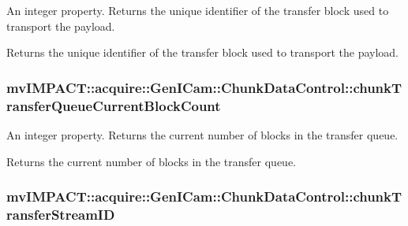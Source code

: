 An integer property. Returns the unique identifier of the transfer block used to transport the payload. 

Returns the unique identifier of the transfer block used to transport the payload. \hypertarget{classmv_i_m_p_a_c_t_1_1acquire_1_1_gen_i_cam_1_1_chunk_data_control_a0eba9a22dc04bd1928c4807cb6dd45fe}{
\subsubsection[{chunk\+Transfer\+Queue\+Current\+Block\+Count}]{ mv\+I\+M\+P\+A\+C\+T\+::acquire\+::\+Gen\+I\+Cam\+::\+Chunk\+Data\+Control\+::chunk\+Transfer\+Queue\+Current\+Block\+Count}}\label{classmv_i_m_p_a_c_t_1_1acquire_1_1_gen_i_cam_1_1_chunk_data_control_a0eba9a22dc04bd1928c4807cb6dd45fe}


An integer property. Returns the current number of blocks in the transfer queue. 

Returns the current number of blocks in the transfer queue. \hypertarget{classmv_i_m_p_a_c_t_1_1acquire_1_1_gen_i_cam_1_1_chunk_data_control_a5d99e230c1a36d0649c93d6d6de2a139}{
\subsubsection[{chunk\+Transfer\+Stream\+I\+D}]{ mv\+I\+M\+P\+A\+C\+T\+::acquire\+::\+Gen\+I\+Cam\+::\+Chunk\+Data\+Control\+::chunk\+Transfer\+Stream\+I\+D}}\label{classmv_i_m_p_a_c_t_1_1acquire_1_1_gen_i_cam_1_1_chunk_data_control_a5d99e230c1a36d0649c93d6d6de2a139}


